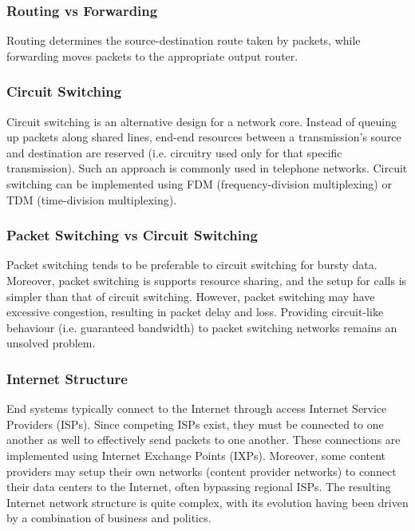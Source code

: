 \documentclass[12pt,titlepage]{article}
\begin{document}
      \subsubsection{Routing vs Forwarding}
        Routing determines the source-destination route taken by packets, while forwarding moves packets to the appropriate output router.

      \subsubsection{Circuit Switching}
        Circuit switching is an alternative design for a network core. Instead of queuing up packets along shared lines, end-end resources
        between a transmission's source and destination are reserved (i.e. circuitry used only for that specific transmission). Such an approach
        is commonly used in telephone networks. Circuit switching can be implemented using FDM (frequency-division multiplexing) or TDM
        (time-division multiplexing).

      \subsubsection{Packet Switching vs Circuit Switching}
        Packet switching tends to be preferable to circuit switching for bursty data. Moreover, packet switching is supports resource sharing,
        and the setup for calls is simpler than that of circuit switching. However, packet switching may have excessive congestion, resulting
        in packet delay and loss. Providing circuit-like behaviour (i.e. guaranteed bandwidth) to packet switching networks remains an unsolved
        problem.

      \subsubsection{Internet Structure}
        End systems typically connect to the Internet through access Internet Service Providers (ISPs). Since competing ISPs exist, they must be
        connected to one another as well to effectively send packets to one another. These connections are implemented using Internet Exchange
        Points (IXPs). Moreover, some content providers may setup their own networks (content provider networks) to connect their data centers to the Internet,
        often bypassing regional ISPs. The resulting Internet network structure is quite complex, with its evolution having been driven by a
        combination of business and politics.
\end{document}
